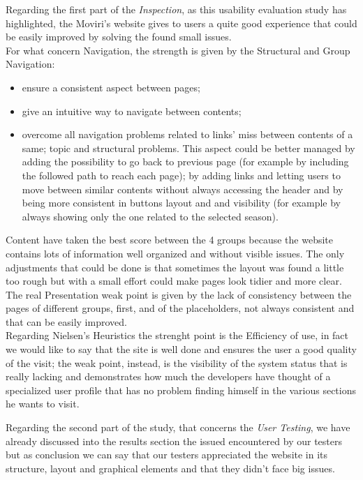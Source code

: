 Regarding the first part of the \textit{Inspection}, as this usability evaluation study has highlighted, the Moviri’s website gives to users a quite good experience that could be easily improved by solving the found small issues.\\ 
For what concern Navigation, the strength is given by the Structural and Group Navigation:
\begin{itemize}
\item ensure a consistent aspect between pages; 
\item give an intuitive way to navigate between contents; 
\item overcome all navigation problems related to links’ miss between contents of a same; topic and structural problems. This aspect could be better managed by adding the possibility to go back to previous page (for example by including the followed path to reach each page); by adding links and letting users to move between similar contents without always accessing the header and by being more consistent in buttons layout and and visibility (for example by always showing only the one related to the selected season).
\end{itemize}
Content have taken the best score between the 4 groups because the website contains lots of information well organized and without visible issues. The only adjustments that could be done is that sometimes the layout was found a little too rough but with a small effort could make pages look tidier and more clear.\\
The real Presentation weak point is given by the lack of consistency between the pages of different groups, first, and of the placeholders, not always consistent and that can be easily improved.\\
Regarding Nielsen’s Heuristics the strenght point is the Efficiency of use, in fact we would like to say that the site is well done and ensures the user a good quality of the visit; the weak point, instead, is the visibility of the system status that is really lacking and demonstrates how much the developers have thought of a specialized user profile that has no problem finding himself in the various sections he wants to visit.
\par
Regarding the second part of the study, that concerns the \textit{User Testing}, we have already discussed into the results section the issued encountered by our testers but as conclusion we can say that our testers appreciated the website in its structure, layout and graphical elements and that they didn’t face big issues.\\
